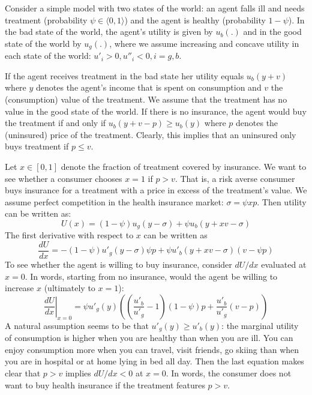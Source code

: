 \documentclass[a4paper,12pt]{article}
\begin{document}
Consider a simple model with two states of the world: an agent falls ill and needs treatment (probability \(\psi \in \langle0,1\rangle\)) and the agent is healthy (probability \(1-\psi\)). In the bad state of the world, the agent's utility is given by \(u_b(.)\) and in the good state of the world by \(u_g(.)\), where we assume increasing and concave utility in each state of the world: \(u'_i > 0, u''_i <0, i=g,b\).

If the agent receives treatment in the bad state her utility equals \(u_b(y+v)\) where \(y\) denotes the agent's income that is spent on consumption and \(v\) the (consumption) value of the treatment. We assume that the treatment has no value in the good state of the world. If there is no insurance, the agent would buy the treatment if and only if \(u_b(y+v-p) \geq u_b(y)\) where \(p\) denotes the (uninsured) price of the treatment. Clearly, this implies that an uninsured only buys treatment if \(p \le v\).

Let \(x \in [0,1]\) denote the fraction of treatment covered by insurance. We want to see whether a consumer chooses \(x=1\) if \(p>v\). That is, a risk averse consumer buys insurance for a treatment with a price in excess of the treatment's value. We assume perfect competition in the health insurance market: \(\sigma = \psi x p\). Then utility can be written as:
\begin{equation}
\label{eq:utility}
U(x) = (1-\psi) u_g(y-\sigma) + \psi u_b (y+xv-\sigma)
\end{equation}
The first derivative with respect to \(x\) can be written as
\begin{equation}
\label{eq:DutilityDx}
\frac{dU}{dx}=-(1-\psi)u'_g(y-\sigma) \psi p + \psi u'_b(y+xv-\sigma)(v-\psi p)
\end{equation}
To see whether the agent is willing to buy insurance, consider \(dU/dx\) evaluated at \(x=0\). In words, starting from no insurance, would the agent be willing to increase \(x\) (ultimately to \(x=1\)):
\begin{equation}
\label{eq:DutilityDxAt0}
\left. \frac{dU}{dx} \right|_{x=0} = \psi u'_g(y) \left( \left(\frac{u'_b}{u'_g} -1 \right) (1-\psi)p + \frac{u'_b}{u'_g} (v-p)  \right)
\end{equation}
A natural assumption seems to be that \(u'_g(y) \ge u'_b(y)\): the marginal utility of consumption is higher when you are healthy than when you are ill. You can enjoy consumption more when you can travel, visit friends, go skiing than when you are in hospital or at home lying in bed all day. Then the last equation makes clear that \(p>v\) implies \(dU/dx < 0\) at \(x=0\). In words, the consumer does not want to buy health insurance if the treatment features \(p>v\).
\end{document}
